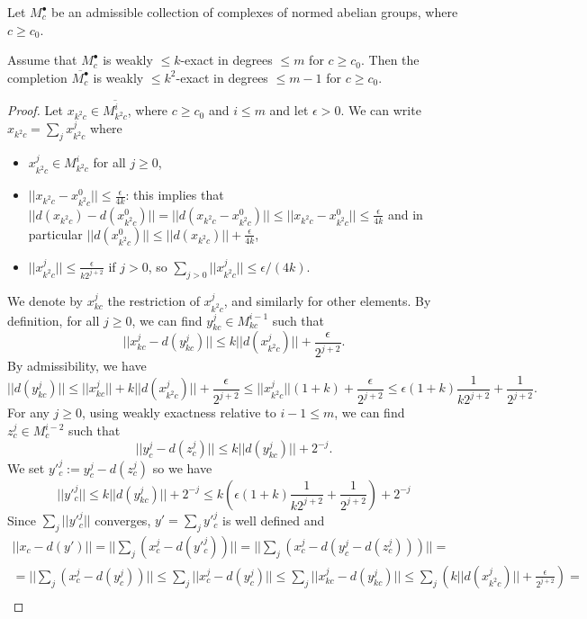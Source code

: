 \begin{lemma}
  \label{completion_is_weakexact}
  Let $M^\bullet_c$ be an admissible collection
  of complexes of normed abelian groups, where $c\geq c_0$.

  Assume that $M^\bullet_c$ is weakly $\leq k$-exact in degrees $\leq m$ for $c\geq c_0$.
  Then the completion $\overline{M^\bullet_c}$ is weakly $\leq k^2$-exact in degrees $\leq m-1$ for $c\geq c_0$.
\end{lemma}

\begin{proof}
Let $x_{k^2c} \in \overline{M^i_{k^2c}}$, where $c \geq c_0$ and $i \leq m$ and let $\epsilon > 0$. We can write $x_{k^2c} = \sum_j x^j_{k^2c}$ where
\begin{itemize}
 \item $x^j_{k^2c} \in M^i_{k^2c}$ for all $j \geq 0$,
 \item $||x_{k^2c} - x^0_{k^2c}|| \leq \frac{\epsilon}{4k}$: this implies that $||d(x_{k^2c}) - d(x_{k^2c}^0)|| = ||d(x_{k^2c} - x_{k^2c}^0)|| \leq ||x_{k^2c} - x_{k^2c}^0|| \leq \frac{\epsilon}{4k}$ and in particular $||d(x_{k^2c}^0)|| \leq ||d(x_{k^2c})|| + \frac{\epsilon}{4k}$,
 \item $||x^j_{k^2c}|| \leq \frac{\epsilon}{k2^{j+2}}$ if $j > 0$, so $\sum_{j > 0} ||x^j_{k^2c}|| \leq \epsilon/(4k)$.
\end{itemize}
We denote by $x^j_{kc}$ the restriction of $x^j_{k^2c}$, and similarly for other elements. By definition, for all $j \geq 0$, we can find $y^j_{kc} \in M^{i-1}_{kc}$ such that
\[
|| x^j_{kc} - d(y^j_{kc}) || \leq k||d(x^j_{k^2c})|| + \frac{\epsilon}{2^{j+2}}.
\]
By admissibility, we have
\[
|| d(y^j_{kc}) || \leq ||x^j_{kc}|| + k||d(x^j_{k^2c})|| + \frac{\epsilon}{2^{j+2}} \leq ||x^j_{k^2c}||(1 + k) + \frac{\epsilon}{2^{j+2}} \leq \epsilon(1+k)\frac{1}{k2^{j+2}} + \frac{1}{2^{j+2}}.
\]
For any $j \geq 0$, using weakly exactness relative to $i-1 \leq m$, we can find $z^j_c \in M^{i-2}_c$ such that
\[
|| y^j_c - d(z^j_c) || \leq k||d(y^j_{kc})|| + 2^{-j}.
\]
We set $y'^j_c := y^j_c - d(z^j_c)$ so we have
\[
||y'^j_c|| \leq k||d(y^j_{kc})|| + 2^{-j} \leq k(\epsilon(1+k)\frac{1}{k2^{j+2}} + \frac{1}{2^{j+2}}) + 2^{-j}
\]
Since $\sum _j ||y'^j_c||$ converges, $y' = \sum_j y'^j_c$ is well defined and
\[\begin{aligned}
||x_c - d(y')|| = ||\sum_j ( x^j_c - d(y'^j_c))|| = ||\sum_j ( x^j_c - d(y^j_c - d(z^j_c)))|| = \\
= ||\sum_j ( x^j_c - d(y^j_c))|| \leq \sum_j || x^j_c - d(y^j_c) || \leq \sum_j || x^j_{kc} - d(y^j_{kc}) || \leq \sum_j (k||d(x^j_{k^2c})|| + \frac{\epsilon}{2^{j+2}}) =\\

\end{aligned}\]
\end{proof}
